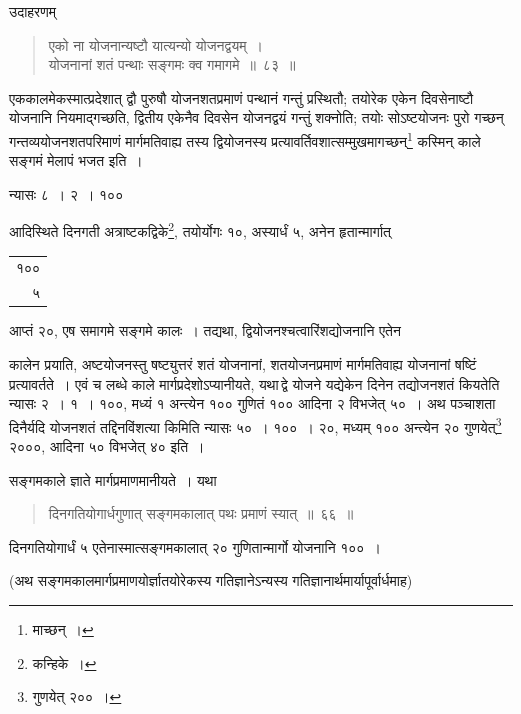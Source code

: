 \documentclass[10pt, openany]{book}
\begin{document}
{{{{{\vspace{3mm}
{उदाहरणम्\textemdash}

\begin{quote}
    
{\eg एको ना योजनान्यष्टौ यात्यन्यो योजनद्वयम्~। \\
 योजनानां शतं पन्थाः सङ्गमः क्व गमागमे~॥~८३~॥}\end{quote}

{एककालमेकस्मात्प्रदेशात् द्वौ पुरुषौ योजनशतप्रमाणं पन्थानं गन्तुं
प्रस्थितौ; तयोरेक}
{एकेन दिवसेनाष्टौ योजनानि नियमाद्गच्छति, द्वितीय एकेनैव दिवसेन योजनद्वयं
गन्तुं शक्नोति;}
{तयोः सोऽष्टयोजनः पुरो गच्छन् गन्तव्ययोजनशतपरिमाणं मार्गमतिवाह्य तस्य
द्वियोजनस्य}
{प्रत्यावर्तिवशात्सम्मुखमागच्छन्\renewcommand{\thefootnote}{\s ८}\footnote{\s *माच्छन्~।} कस्मिन् काले सङ्गमं मेलापं भजत इति~।}

\newpage

न्यासः\textendash \hspace{2mm} ८~। २~। १०० 
\vspace{3mm}

{आदिस्थिते दिनगती अत्राष्टकद्विके\renewcommand{\thefootnote}{\s १}\footnote{\s *कन्हिके~।}, तयोर्योगः १०, अस्यार्धं ५, अनेन
हृतान्मार्गात्\begin{tabular}{r}१००\\ ५\end{tabular} आप्तं २०, एष समागमे सङ्गमे कालः~। तद्यथा,
द्वियोजनश्चत्वारिंशद्योजनानि एतेन}
{कालेन प्रयाति, अष्टयोजनस्तु षष्ट्युत्तरं शतं योजनानां, शतयोजनप्रमाणं
मार्गमतिवाह्य योजनानां षष्टिं प्रत्यावर्तते~। एवं च लब्धे काले मार्गप्रदेशोऽप्यानीयते,
यथा\textendash \,द्वे योजने यद्येकेन}
{दिनेन तद्योजनशतं कियतेति न्यासः २~। १~। १००, मध्यं १ अन्त्येन १००
गुणितं १००}
{आदिना २ विभजेत् ५०~। अथ पञ्चाशता दिनैर्यदि योजनशतं तद्दिनविंशत्या
किमिति न्यासः}
{५०~। १००~। २०, मध्यम् १०० अन्त्येन २० गुणयेत्\renewcommand{\thefootnote}{\s २}\footnote{\s गुणयेत् २००~।} २०००, आदिना ५०
विभजेत्}
{४० इति~।}
\vspace{3mm}

{सङ्गमकाले ज्ञाते मार्गप्रमाणमानीयते~। यथा\textemdash}

\begin{quote}

{\bs दिनगतियोगार्धगुणात् सङ्गमकालात् पथः प्रमाणं स्यात्~॥~६६~॥}
\end{quote}

{दिनगतियोगार्धं ५ एतेनास्मात्सङ्गमकालात् २० गुणितान्मार्गो योजनानि १००~।}
\vspace{3mm}

{(अथ सङ्गमकालमार्गप्रमाणयोर्ज्ञातयोरेकस्य गतिज्ञानेऽन्यस्य
गतिज्ञानार्थमार्यापूर्वार्धमाह\textemdash)}

}}}}}
\end{document}
